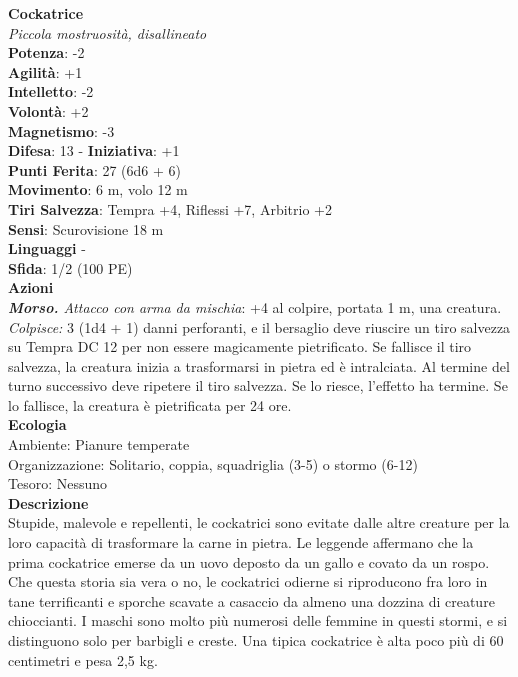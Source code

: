 \begin{multicols}{2}
\medskip\textbf{Cockatrice}\\
\emph{Piccola mostruosità, disallineato}\\
\textbf{Potenza}: -2\\
\textbf{Agilità}: +1\\
\textbf{Intelletto}: -2\\
\textbf{Volontà}: +2\\
\textbf{Magnetismo}: -3\\
\textbf{Difesa}: 13 - \textbf{Iniziativa}: +1\\
\textbf{Punti Ferita}: 27 (6d6 + 6)\\
\textbf{Movimento}: 6 m, volo 12 m\\
\textbf{Tiri Salvezza}: Tempra +4, Riflessi +7, Arbitrio +2\\
\textbf{Sensi}: Scurovisione 18 m\\
\textbf{Linguaggi} -\\
\textbf{Sfida}: 1/2 (100 PE)\smallskip\\
\smallskip\textbf{Azioni}\\
\emph{\textbf{Morso.} Attacco con arma da mischia}: +4 al colpire, portata 1 m, una creatura.\\
\emph{Colpisce:} 3 (1d4 + 1) danni perforanti, e il bersaglio deve riuscire un tiro salvezza su Tempra DC  12 per non essere magicamente pietrificato. Se fallisce il tiro salvezza, la creatura inizia a trasformarsi in pietra ed è intralciata. Al termine del turno successivo deve ripetere il tiro salvezza. Se lo riesce, l'effetto ha termine. Se lo fallisce, la creatura è pietrificata per 24 ore.\\
\textbf{Ecologia}\\
Ambiente: Pianure temperate\\
Organizzazione: Solitario, coppia, squadriglia (3-5) o stormo (6-12)\\
Tesoro: Nessuno\\
\textbf{Descrizione}\\
Stupide, malevole e repellenti, le cockatrici sono evitate dalle altre creature per la loro capacità di trasformare la carne in pietra. Le leggende affermano che la prima cockatrice emerse da un uovo deposto da un gallo e covato da un rospo. Che questa storia sia vera o no, le cockatrici odierne si riproducono fra loro in tane terrificanti e sporche scavate a casaccio da almeno una dozzina di creature chioccianti. I maschi sono molto più numerosi delle femmine in questi stormi, e si distinguono solo per barbigli e creste. Una tipica cockatrice è alta poco più di 60 centimetri e pesa 2,5 kg.\\

\end{multicols}
